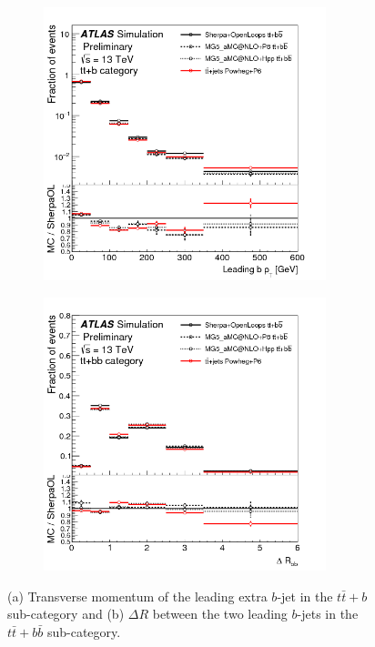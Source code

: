 \begin{figure}[t!]
\begin{subfigure}{0.5\textwidth}
  \centering
  \includegraphics[width=0.9\textwidth]{figures/Datasamples/bpt2.png}
  \caption{}
  \label{fig:dat:ttb:bpt}
\end{subfigure}
\begin{subfigure}{0.5\textwidth}
  \centering
  \includegraphics[width=0.9\textwidth]{figures/Datasamples/drbb2.png}
  \caption{}
  \label{fig:dat:ttb:drbb}
\end{subfigure}

\captionsetup{width=0.85\textwidth} \caption{\small (a) Transverse momentum of the leading extra $b$-jet in the $t\bar{t}+b$ sub-category and (b) $\Delta R$ between the two leading $b$-jets in the $t\bar{t}+b\bar{b}$ sub-category.}
\label{fig:dat:ttb:kincat}
\end{figure}

